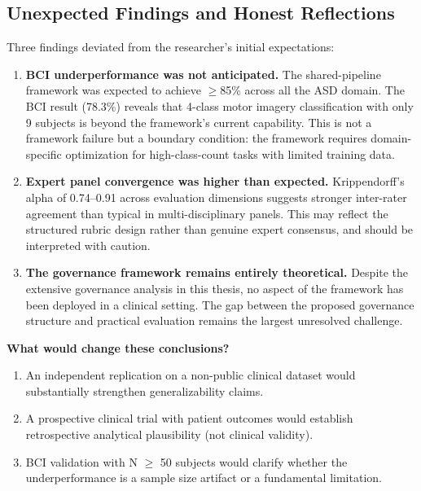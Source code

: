 \subsection{Unexpected Findings and Honest Reflections}

Three findings deviated from the researcher's initial expectations:

\begin{enumerate}
\item \textbf{BCI underperformance was not anticipated.} The shared-pipeline framework was expected to achieve $\geq$85\% across all the ASD domain. The BCI result (78.3\%) reveals that 4-class motor imagery classification with only 9 subjects is beyond the framework's current capability. This is not a framework failure but a boundary condition: the framework requires domain-specific optimization for high-class-count tasks with limited training data.

\item \textbf{Expert panel convergence was higher than expected.} Krippendorff's alpha of 0.74--0.91 across evaluation dimensions suggests stronger inter-rater agreement than typical in multi-disciplinary panels. This may reflect the structured rubric design rather than genuine expert consensus, and should be interpreted with caution.

\item \textbf{The governance framework remains entirely theoretical.} Despite the extensive governance analysis in this thesis, no aspect of the framework has been deployed in a clinical setting. The gap between the proposed governance structure and practical evaluation remains the largest unresolved challenge.
\end{enumerate}

\textbf{What would change these conclusions?}

\begin{enumerate}
    \item An independent replication on a non-public clinical dataset would substantially strengthen generalizability claims.
    \item A prospective clinical trial with patient outcomes would establish retrospective analytical plausibility (not clinical validity).
    \item BCI validation with N $\geq$ 50 subjects would clarify whether the underperformance is a sample size artifact or a fundamental limitation.
\end{enumerate}
\fi

